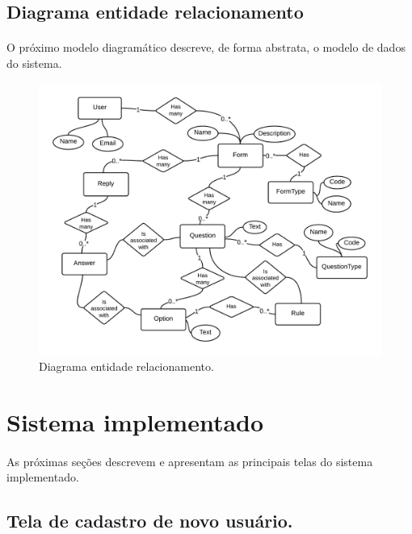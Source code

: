 \documentclass[11pt]{article}
\begin{document}
  \clearpage
  
    \subsection{Diagrama entidade relacionamento}
    
    \paragraph{}
    O próximo modelo diagramático descreve, de forma abstrata, o modelo de dados do sistema.

      \begin{figure}[h!]
        \centering
        \includegraphics[width=1.0\textwidth]{er.png}
        \caption{Diagrama entidade relacionamento.}
      \end{figure}
        
  \clearpage
  
  \section{Sistema implementado}
    
    \paragraph{}
    
    As próximas seções descrevem e apresentam as principais telas do sistema implementado. 
    
    \subsection{Tela de cadastro de novo usuário.}
    
\end{document}

